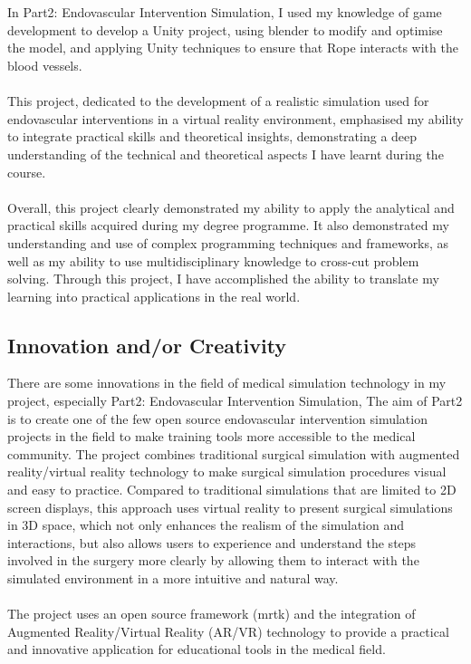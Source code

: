 \documentclass[12pt]{article}
\begin{document}
\\\\
In Part2: Endovascular Intervention Simulation, I used my knowledge of game development to develop a Unity project, using \gls{blender} to modify and optimise the model, and applying Unity techniques to ensure that Rope interacts with the blood vessels.
\\\\
This project, dedicated to the development of a realistic simulation used for endovascular interventions in a virtual reality environment, emphasised my ability to integrate practical skills and theoretical insights, demonstrating a deep understanding of the technical and theoretical aspects I have learnt during the course.
\\\\
Overall, this project clearly demonstrated my ability to apply the analytical and practical skills acquired during my degree programme. It also demonstrated my understanding and use of complex programming techniques and frameworks, as well as my ability to use multidisciplinary knowledge to cross-cut problem solving. Through this project, I have accomplished the ability to translate my learning into practical applications in the real world.



\subsection{Innovation and/or Creativity}
There are some innovations in the field of medical simulation technology in my project, especially Part2: Endovascular Intervention Simulation, The aim of Part2 is to create one of the few open source endovascular intervention simulation projects in the field to make training tools more accessible to the medical community. The project combines traditional surgical simulation with augmented reality/virtual reality technology to make surgical simulation procedures visual and easy to practice. Compared to traditional simulations that are limited to 2D screen displays, this approach uses virtual reality to present surgical simulations in 3D space, which not only enhances the realism of the simulation and interactions, but also allows users to experience and understand the steps involved in the surgery more clearly by allowing them to interact with the simulated environment in a more intuitive and natural way.
\\\\
The project uses an open source framework (\gls{mrtk}) and the integration of Augmented Reality/Virtual Reality (AR/VR) technology to provide a practical and innovative application for educational tools in the medical field.
\end{document}
